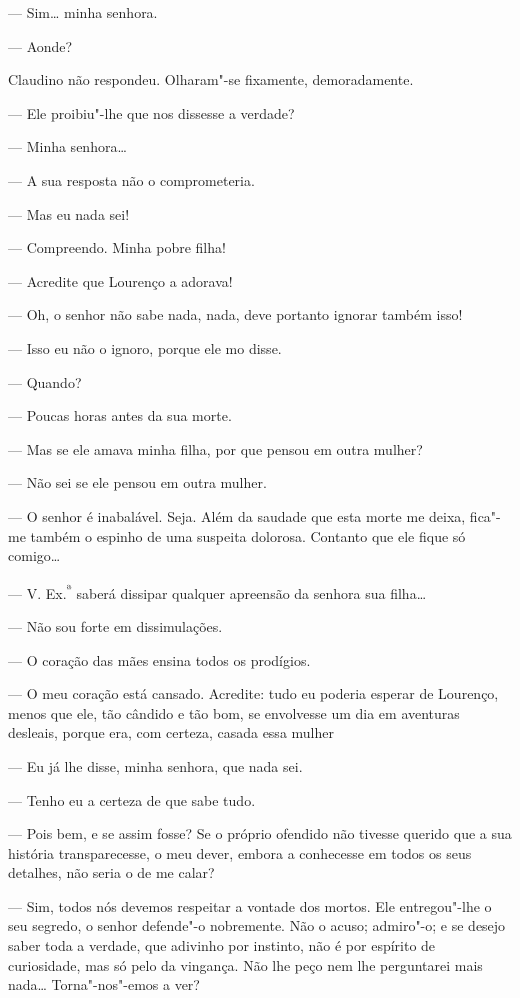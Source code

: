 --- Sim\ldots{} minha senhora.

--- Aonde?

Claudino não respondeu. Olharam"-se fixamente, demoradamente.

--- Ele proibiu"-lhe que nos dissesse a verdade?

--- Minha senhora\ldots{}

--- A sua resposta não o comprometeria.

--- Mas eu nada sei!

--- Compreendo. Minha pobre filha!

--- Acredite que Lourenço a adorava!

--- Oh, o senhor não sabe nada, nada, deve portanto ignorar também isso!

--- Isso eu não o ignoro, porque ele mo disse.

--- Quando?

--- Poucas horas antes da sua morte.

--- Mas se ele amava minha filha, por que pensou em outra mulher?

--- Não sei se ele pensou em outra mulher.

--- O senhor é inabalável. Seja. Além da saudade que esta morte me
deixa, fica"-me também o espinho de uma suspeita dolorosa. Contanto que
ele fique só comigo\ldots{}

--- V. Ex.\textsuperscript{ª} saberá dissipar qualquer apreensão da
senhora sua filha\ldots{}

--- Não sou forte em dissimulações.

--- O coração das mães ensina todos os prodígios.

--- O meu coração está cansado. Acredite: tudo eu poderia esperar de
Lourenço, menos que ele, tão cândido e tão bom, se envolvesse um dia em
aventuras desleais, porque era, com certeza, casada essa mulher

--- Eu já lhe disse, minha senhora, que nada sei.

--- Tenho eu a certeza de que sabe tudo.

--- Pois bem, e se assim fosse? Se o próprio ofendido não tivesse
querido que a sua história transparecesse, o meu dever, embora a
conhecesse em todos os seus detalhes, não seria o de me calar?

--- Sim, todos nós devemos respeitar a vontade dos mortos. Ele
entregou"-lhe o seu segredo, o senhor defende"-o nobremente. Não o acuso;
admiro"-o; e se desejo saber toda a verdade, que adivinho por instinto,
não é por espírito de curiosidade, mas só pelo da vingança. Não lhe peço
nem lhe perguntarei mais nada\ldots{} Torna"-nos"-emos a ver?

